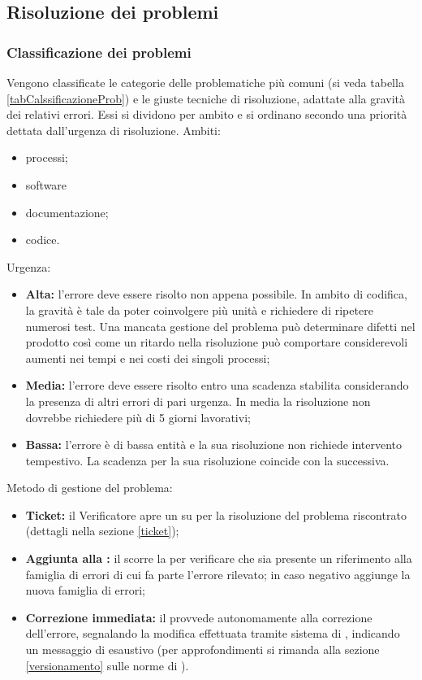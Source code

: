 \documentclass[12pt,a4paper]{article}
\begin{document}
\subsection{Risoluzione dei problemi}

\subsubsection{Classificazione dei problemi}
Vengono classificate le categorie delle problematiche più comuni (si veda tabella \ref{tabCalssificazioneProb}) e le giuste tecniche di risoluzione, adattate alla gravità dei relativi errori. Essi si dividono per ambito e si ordinano secondo una priorità dettata dall'urgenza di risoluzione. Ambiti:
\begin{itemize}
	\item processi;
	\item software
	\item documentazione;
	\item codice.
\end{itemize}
Urgenza:
\begin{itemize}
	\item \textbf{Alta:} l'errore deve essere risolto non appena possibile. In ambito di codifica, la gravità è tale da poter coinvolgere più unità e richiedere di ripetere numerosi test. Una mancata gestione del problema può determinare difetti nel prodotto così come un ritardo nella risoluzione può comportare considerevoli aumenti nei tempi e nei costi dei singoli processi;
	\item \textbf{Media:} l'errore deve essere risolto entro una scadenza stabilita considerando la presenza di altri errori di pari urgenza. In media la risoluzione non dovrebbe richiedere più di 5 giorni lavorativi;
	\item \textbf{Bassa:} l'errore è di bassa entità e la sua risoluzione non richiede intervento tempestivo. La scadenza per la sua risoluzione coincide con la  successiva.
\end{itemize}
Metodo di gestione del problema:
\begin{itemize}
	\item \textbf{Ticket:} il Verificatore apre un  su  per la risoluzione del problema riscontrato (dettagli nella sezione \ref{ticket});
	\item \textbf{Aggiunta alla :} il \VR{} scorre la  per verificare che sia presente un riferimento alla famiglia di errori di cui fa parte l'errore rilevato; in caso negativo aggiunge la nuova famiglia di errori;
	\item \textbf{Correzione immediata:} il \VR{} provvede autonomamente alla correzione dell'errore, segnalando la modifica effettuata tramite sistema di , indicando un messaggio di  esaustivo (per approfondimenti si rimanda alla sezione \ref{versionamento} sulle norme di ).
\end{itemize}
\end{document}
